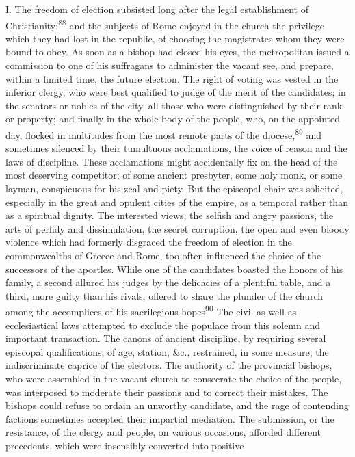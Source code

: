 I. The freedom of election subsisted long after the legal establishment
of Christianity;\textsuperscript{88} and the subjects of Rome enjoyed in the church the
privilege which they had lost in the republic, of choosing the
magistrates whom they were bound to obey. As soon as a bishop had
closed his eyes, the metropolitan issued a commission to one of his
suffragans to administer the vacant see, and prepare, within a limited
time, the future election. The right of voting was vested in the
inferior clergy, who were best qualified to judge of the merit of the
candidates; in the senators or nobles of the city, all those who were
distinguished by their rank or property; and finally in the whole body
of the people, who, on the appointed day, flocked in multitudes from
the most remote parts of the diocese,\textsuperscript{89} and sometimes silenced by
their tumultuous acclamations, the voice of reason and the laws of
discipline. These acclamations might accidentally fix on the head of
the most deserving competitor; of some ancient presbyter, some holy
monk, or some layman, conspicuous for his zeal and piety. But the
episcopal chair was solicited, especially in the great and opulent
cities of the empire, as a temporal rather than as a spiritual dignity.
The interested views, the selfish and angry passions, the arts of
perfidy and dissimulation, the secret corruption, the open and even
bloody violence which had formerly disgraced the freedom of election in
the commonwealths of Greece and Rome, too often influenced the choice
of the successors of the apostles. While one of the candidates boasted
the honors of his family, a second allured his judges by the delicacies
of a plentiful table, and a third, more guilty than his rivals, offered
to share the plunder of the church among the accomplices of his
sacrilegious hopes\textsuperscript{90} The civil as well as ecclesiastical laws
attempted to exclude the populace from this solemn and important
transaction. The canons of ancient discipline, by requiring several
episcopal qualifications, of age, station, \&c., restrained, in some
measure, the indiscriminate caprice of the electors. The authority of
the provincial bishops, who were assembled in the vacant church to
consecrate the choice of the people, was interposed to moderate their
passions and to correct their mistakes. The bishops could refuse to
ordain an unworthy candidate, and the rage of contending factions
sometimes accepted their impartial mediation. The submission, or the
resistance, of the clergy and people, on various occasions, afforded
different precedents, which were insensibly converted into positive
